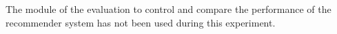 


The module of the evaluation to control and compare the performance of the recommender
system has not been used during this experiment.
\hfill\break
\hfill\break

